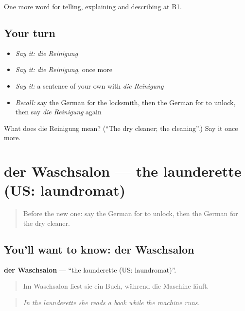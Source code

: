 \begin{grammarlens}[title={What you've built}]
One more word for telling, explaining and describing at B1.
\end{grammarlens}

\subsection*{Your turn}
\begin{itemize}
\raggedright
  \item \emph{Say it:} \emph{die Reinigung}
  \item \emph{Say it:} \emph{die Reinigung}, once more
  \item \emph{Say it:} a sentence of your own with \emph{die Reinigung}
  \item \emph{Recall:} say the German for the locksmith, then the German for to unlock, then say \emph{die Reinigung} again
\end{itemize}

\begin{tcolorbox}[breakable,colback=teal!4,colframe=teal!35!black,title={Before you move on}]
What does die Reinigung mean? (\textquotedblleft{}The dry cleaner; the cleaning\textquotedblright{}.) Say it once more.
\end{tcolorbox}
\section[der Waschsalon]{der Waschsalon — the launderette (US: laundromat)}

\label{lesson:GE-C446-waschsalon}



\begin{quote}
Before the new one: say the German for to unlock, then the German for the dry cleaner.
\end{quote}

\subsection*{You'll want to know: der Waschsalon}
\textbf{der Waschsalon} — \textquotedblleft{}the launderette (US: laundromat)\textquotedblright{}.

\begin{quote}
Im Waschsalon liest sie ein Buch, während die Maschine läuft.
\end{quote}

\begin{quote}
\emph{In the launderette she reads a book while the machine runs.}
\end{quote}

